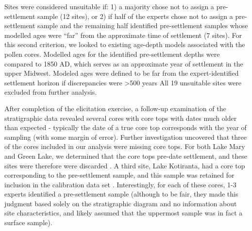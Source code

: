 \documentclass[12pt]{article}
\begin{document}

Sites were considered unsuitable if: 1) a majority chose not to assign
a pre-settlement sample (12 sites), or 2) if half of the experts chose
not to assign a pre-settlement sample and the remaining half
identified pre-settlement samples whose modelled ages were “far” from
the approximate time of settlement (7 sites). For this second
criterion, we looked to existing age-depth models associated with the
pollen cores. Modelled ages for the identified pre-settlement depths
were compared to 1850 AD, which serves as an approximate year of
settlement in the upper Midwest.  Modeled ages were defined to be far
from the expert-identified settlement horizon if discrepancies were
>500 years All 19 unsuitable sites were excluded from further
analysis.

After completion of the elicitation exercise, a follow-up examination
of the stratigraphic data revealed several cores with core tops with
dates much older than expected - typically the date of a true core top
corresponds with the year of sampling (with some margin of
error). Further investigation uncovered that three of the cores
included in our analysis were missing core tops. For both Lake Mary
and Green Lake, we determined that the core tops pre-date settlement,
and these sites were therefore were discarded \citep{webb1971late,
  lawrenz1975}. A third site, Lake Kotiranta, had a core top
corresponding to the pre-settlement sample, and this sample was
retained for inclusion in the calibration data set
\citep{wright1969}. Interestingly, for each of these cores, 1-3
experts identified a pre-settlement sample (although to be fair, they
made this judgment based solely on the stratigraphic diagram and no
information about site characteristics, and likely assumed that the
uppermost sample was in fact a surface sample).
\end{document}
